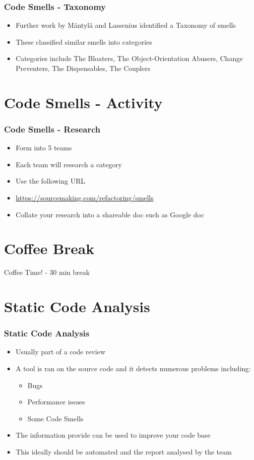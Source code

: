 \begin{frame}
\frametitle{Code Smells - Taxonomy}
\begin{itemize}
	\item Further work by M{\"a}ntyl{\"a} and Lassenius identified a Taxonomy of smells
	\item These classified similar smells into categories
	\item Categories include The Bloaters, The Object-Orientation Abusers, Change Preventers, The Dispensables, The Couplers 
\end{itemize}
\end{frame}

\section{Code Smells - Activity}

\begin{frame}
	\frametitle{Code Smells - Research}
	\begin{itemize}
		\item Form into 5 teams
		\item Each team will research a category
		\item Use the following URL
		\item \url{https://sourcemaking.com/refactoring/smells}
		\item Collate your research into a shareable doc such as Google doc
	\end{itemize}
\end{frame}

\section{Coffee Break}
\begin{frame}
	\begin{center}
		Coffee Time! - 30 min break
	\end{center}
\end{frame}

\section{Static Code Analysis}

\begin{frame}
	\frametitle{Static Code Analysis}
	\begin{itemize}
		\item Usually part of a code review
		\item A tool is ran on the source code and it detects numerous problems including:
		\begin{itemize}
			\item Bugs
			\item Performance issues
			\item Some Code Smells
		\end{itemize}
		\item The information provide can be used to improve your code base
		\item This ideally should be automated and the report analysed by the team
	\end{itemize}
\end{frame}

